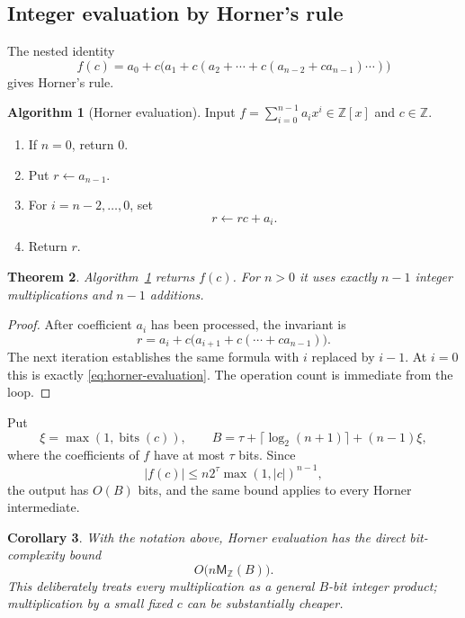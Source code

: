 \documentclass[11pt]{book}
\newtheorem{theorem}{Theorem}[section]
\newtheorem{corollary}[theorem]{Corollary}
\theoremstyle{definition}
\newtheorem{algorithm}[theorem]{Algorithm}
\newcommand{\ZZ}{\mathbb Z}
\newcommand{\bits}{\operatorname{bits}}
\newcommand{\MZ}{\mathsf M_{\ZZ}}
\begin{document}
\subsection{Integer evaluation by Horner's rule}

The nested identity
\begin{equation}\label{eq:horner-evaluation}
 f(c)=a_0+c\bigl(a_1+c(a_2+\cdots+c(a_{n-2}+ca_{n-1})\cdots)\bigr)
\end{equation}
gives Horner's rule.

\begin{algorithm}[Horner evaluation]\label{alg:horner-evaluation}
Input $f=\sum_{i=0}^{n-1}a_ix^i\in\ZZ[x]$ and $c\in\ZZ$.
\begin{enumerate}
 \item If $n=0$, return $0$.
 \item Put $r\leftarrow a_{n-1}$.
 \item For $i=n-2,\ldots,0$, set
 \[
   r\leftarrow rc+a_i.
 \]
 \item Return $r$.
\end{enumerate}
\end{algorithm}

\begin{theorem}\label{thm:horner-evaluation}
Algorithm~\ref{alg:horner-evaluation} returns $f(c)$.  For $n>0$ it uses
exactly $n-1$ integer multiplications and $n-1$ additions.
\end{theorem}

\begin{proof}
After coefficient $a_i$ has been processed, the invariant is
\[
 r=a_i+c\bigl(a_{i+1}+c(\cdots+ca_{n-1})\bigr).
\]
The next iteration establishes the same formula with $i$ replaced by $i-1$.
At $i=0$ this is exactly \eqref{eq:horner-evaluation}.  The operation count is
immediate from the loop.
\end{proof}

Put
\[
 \xi=\max(1,\bits(c)),
 \qquad
 B=\tau+\lceil\log_2(n+1)\rceil+(n-1)\xi,
\]
where the coefficients of $f$ have at most $\tau$ bits.  Since
\[
 |f(c)|\le n2^\tau\max(1,|c|)^{n-1},
\]
the output has $O(B)$ bits, and the same bound applies to every Horner
intermediate.

\begin{corollary}\label{cor:horner-evaluation-bit}
With the notation above, Horner evaluation has the direct bit-complexity bound
\[
 O\bigl(n\MZ(B)\bigr).
\]
This deliberately treats every multiplication as a general $B$-bit integer
product; multiplication by a small fixed $c$ can be substantially cheaper.
\end{corollary}
\end{document}
